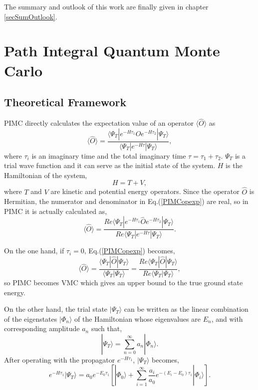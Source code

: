 \documentclass[12pt,letterpaper,UTF8]{report}
\begin{document}
The summary and outlook of this work are finally given in chapter \ref{secSumOutlook}.



\chapter{Path Integral Quantum Monte Carlo}
\label{ChapPIMC}






\section{Theoretical Framework}
\label{TheoFrame}
PIMC directly calculates the expectation value of an operator $\langle \hat{O} \rangle$ as
\begin{equation}
\langle \hat{O} \rangle= \frac{  \langle \Psi_T| e^{-H \tau_1}  \hat{O} e^{-H \tau_2 } | \Psi_T \rangle  }
{\langle \Psi_T| e^{-H \tau} | \Psi_T \rangle}, \label{PIMCopexp}
\end{equation}
where $\tau_i$ is an imaginary time and the total imaginary time $\tau=\tau_1+\tau_2$. $\Psi_T$ is a trial wave function and it can serve as the initial state of the system. $H$ is the Hamiltonian of the system,
\begin{equation}
H=T+V, \label{HTV}
\end{equation}
where $T$ and $V$ are kinetic and potential energy operators.
Since the operator $\hat{O}$ is Hermitian, the numerator and denominator in Eq.(\ref{PIMCopexp}) are real, so in PIMC it is actually calculated as,
\begin{equation}
\langle \hat{O} \rangle
= \frac{ Re  \langle \Psi_T| e^{-H \tau_1}  \hat{O} e^{-H \tau_2 } | \Psi_T \rangle  }
{ Re \langle \Psi_T| e^{-H \tau} | \Psi_T \rangle} .
\label{PIMCopexpdetail}
\end{equation}

On the one hand, if $\tau_i=0$, Eq.(\ref{PIMCopexp}) becomes,
 \begin{equation}
\langle \hat{O} \rangle  = \frac{ \langle \Psi_T | \hat{O}   | \Psi_T  \rangle }   { \langle \Psi_T | \Psi_T  \rangle  }
=\frac{ Re \langle \Psi_T | \hat{O}   | \Psi_T  \rangle }   { Re \langle \Psi_T | \Psi_T  \rangle  } , \label{VMCoexp}
\end{equation}
so PIMC becomes VMC which gives an upper bound to the true ground state energy.

On the other hand, the trial state $| \Psi_T \rangle$ can be written as the linear combination of the eigenstates $|\Phi_n\rangle$ of the Hamiltonian whose eigenvalues are $E_n$, and with corresponding amplitude $a_n$ such that,
\begin{equation}
|\Psi_T \rangle = \sum_{n=0}^{\infty} a_n |\Phi_n\rangle .
\label{PsiTexpansion}
\end{equation}
After operating with the propagator $e^{-H \tau_1}$, $| \Psi_T \rangle$ becomes,
\begin{equation}
 e^{-H \tau_1} |\Psi_T \rangle =
a_0e^{-E_0 \tau_1}
\left[   | \Phi_0 \rangle  + \sum_{i=1}^{\infty}\frac{a_i}{a_0}e^{-(E_i-E_0) \tau_1} | \Phi_i \rangle \right].
\label{eHPsiT}
\end{equation}
\end{document}
